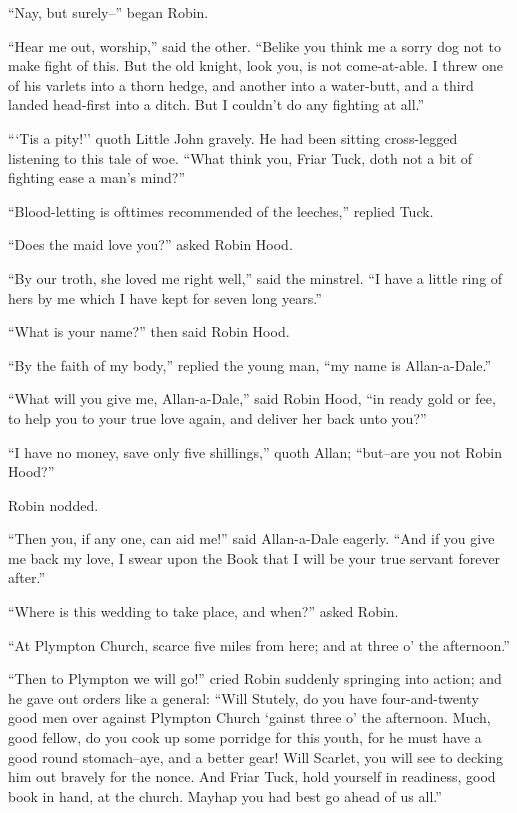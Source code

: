 ``Nay, but surely--'' began Robin.

``Hear me out, worship,'' said the other. ``Belike you think me a sorry
dog not to make fight of this. But the old knight, look you, is not
come-at-able. I threw one of his varlets into a thorn hedge, and another
into a water-butt, and a third landed head-first into a ditch. But I
couldn't do any fighting at all.''

```Tis a pity!'' quoth Little John gravely. He had been sitting
cross-legged listening to this tale of woe. ``What think you, Friar
Tuck, doth not a bit of fighting ease a man's mind?''

``Blood-letting is ofttimes recommended of the leeches,'' replied Tuck.

``Does the maid love you?'' asked Robin Hood.

``By our troth, she loved me right well,'' said the minstrel. ``I have a
little ring of hers by me which I have kept for seven long years.''

``What is your name?'' then said Robin Hood.

``By the faith of my body,'' replied the young man, ``my name is
Allan-a-Dale.''

``What will you give me, Allan-a-Dale,'' said Robin Hood, ``in ready
gold or fee, to help you to your true love again, and deliver her back
unto you?''

``I have no money, save only five shillings,'' quoth Allan; ``but--are
you not Robin Hood?''

Robin nodded.

``Then you, if any one, can aid me!'' said Allan-a-Dale eagerly. ``And
if you give me back my love, I swear upon the Book that I will be your
true servant forever after.''

``Where is this wedding to take place, and when?'' asked Robin.

``At Plympton Church, scarce five miles from here; and at three o' the
afternoon.''

``Then to Plympton we will go!'' cried Robin suddenly springing into
action; and he gave out orders like a general: ``Will Stutely, do you
have four-and-twenty good men over against Plympton Church `gainst three
o' the afternoon. Much, good fellow, do you cook up some porridge for
this youth, for he must have a good round stomach--aye, and a better
gear! Will Scarlet, you will see to decking him out bravely for the
nonce. And Friar Tuck, hold yourself in readiness, good book in hand, at
the church. Mayhap you had best go ahead of us all.''

